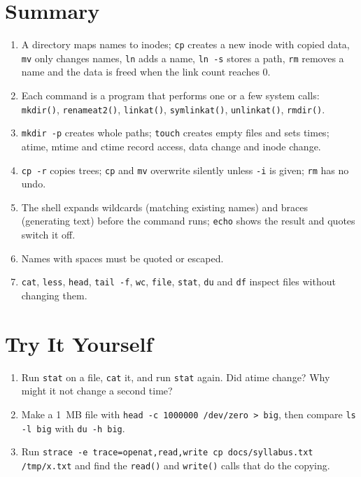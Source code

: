\documentclass[11pt,a4paper]{article}
\newcommand{\cmd}[1]{\texttt{#1}}
\begin{document}
\section{Summary}

\begin{keyidea}
\begin{enumerate}[leftmargin=1.4em]
  \item A directory maps names to inodes; \cmd{cp} creates a new inode with copied data, \cmd{mv} only changes names, \cmd{ln} adds a name, \cmd{ln -s} stores a path, \cmd{rm} removes a name and the data is freed when the link count reaches $0$.
  \item Each command is a program that performs one or a few system calls: \cmd{mkdir()}, \cmd{renameat2()}, \cmd{linkat()}, \cmd{symlinkat()}, \cmd{unlinkat()}, \cmd{rmdir()}.
  \item \cmd{mkdir -p} creates whole paths; \cmd{touch} creates empty files and sets times; atime, mtime and ctime record access, data change and inode change.
  \item \cmd{cp -r} copies trees; \cmd{cp} and \cmd{mv} overwrite silently unless \cmd{-i} is given; \cmd{rm} has no undo.
  \item The shell expands wildcards (matching existing names) and braces (generating text) before the command runs; \cmd{echo} shows the result and quotes switch it off.
  \item Names with spaces must be quoted or escaped.
  \item \cmd{cat}, \cmd{less}, \cmd{head}, \cmd{tail -f}, \cmd{wc}, \cmd{file}, \cmd{stat}, \cmd{du} and \cmd{df} inspect files without changing them.
\end{enumerate}
\end{keyidea}

\section{Try It Yourself}

\begin{tryit}
\begin{enumerate}[leftmargin=1.4em]
  \item Run \cmd{stat} on a file, \cmd{cat} it, and run \cmd{stat} again. Did atime change? Why might it not change a second time?
  \item Make a 1~MB file with \cmd{head -c 1000000 /dev/zero > big}, then compare \cmd{ls -l big} with \cmd{du -h big}.
  \item Run \cmd{strace -e trace=openat,read,write cp docs/syllabus.txt /tmp/x.txt} and find the \cmd{read()} and \cmd{write()} calls that do the copying.
\end{enumerate}
\end{tryit}
\end{document}
